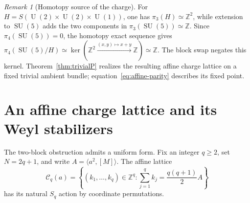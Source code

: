 \documentclass[11pt]{amsart}
\newcommand{\SU}{\operatorname{SU}}
\newcommand{\U}{\operatorname{U}}
\newcommand{\Z}{\mathbb Z}
\theoremstyle{plain}
\theoremstyle{definition}
\theoremstyle{remark}
\newtheorem{remark}[theorem]{Remark}
\begin{document}
\begin{remark}[Homotopy source of the charge]
For $H=S(\U(2)\times\U(2)\times\U(1))$, one has $\pi_3(H)\simeq\Z^2$, while extension to $\SU(5)$ adds the two components in $\pi_3(\SU(5))\simeq\Z$. Since $\pi_4(\SU(5))=0$, the homotopy exact sequence gives $\pi_4(\SU(5)/H)\simeq\ker(\Z^2\xrightarrow{(x,y)\mapsto x+y}\Z)\simeq\Z$. The block swap negates this kernel. Theorem~\ref{thm:trivialP} realizes the resulting affine charge lattice on a fixed trivial ambient bundle; equation~\eqref{eq:affine-parity} describes its fixed point.
\end{remark}

\section{An affine charge lattice and its Weyl stabilizers}

The two-block obstruction admits a uniform form. Fix an integer $q\geq2$, set
$N=2q+1$, and write $A=\langle a^2,[M]\rangle$. The affine lattice
\begin{equation}\label{eq:charge-lattice}
 \mathcal C_q(a)=\left\{(k_1,\ldots,k_q)\in\Z^q:
 \sum_{j=1}^q k_j=\frac{q(q+1)}2 A\right\}
\end{equation}
has its natural $S_q$ action by coordinate permutations.
\end{document}
